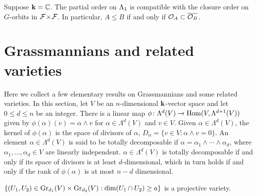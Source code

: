 \documentclass[a4paper, 11pt]{report}
\begin{document}
\begin{conjecture}
Suppose $\field=\complex$. The partial order on $\matrices$ is compatible with the closure order on $G$-orbits in $\dblflags$. In particular, $A\le B$ if and only if $\orbit{A}\subset \overline{\orbit{B}}$.
\end{conjecture}


\section{Grassmannians and related varieties}

Here we collect a few elementary results on Grassmannians and some related varieties. In this section, let $V$ be an $n$-dimensional $\field$-vector space and let $0\le d\le n$ be an integer. There is a linear map $\phi\colon\Lambda^d(V)\to\HOM(V,\Lambda^{d+1}(V))$ given by $\phi(\alpha)(v)=\alpha\wedge v$ for $\alpha\in\Lambda^d(V)$ and $v\in V$. Given $\alpha\in\Lambda^d(V)$, the kernel of $\phi(\alpha)$ is the space of divisors of $\alpha$, $D_\alpha=\{v\in V:\alpha\wedge v=0\}$. An element $\alpha\in\Lambda^d(V)$ is said to be totally decomposable if $\alpha = \alpha_1\wedge\cdots\wedge\alpha_d$, where $\alpha_1,\ldots,\alpha_d\in V$ are linearly independent. $\alpha\in\Lambda^d(V)$ is totally decomposable if and only if its space of divisors is at least $d$-dimensional, which in turn holds if and only if the rank of $\phi(\alpha)$ is at most $n-d$ dimensional.

\begin{lemma}\label{lemma:2-step-flags}
$\{(U_1,U_2)\in\GR[d_1]{V}\times\GR[d_2]{V}: \dim(U_1\cap U_2)\geq a\}$ is a projective variety.
\end{lemma}
\end{document}
